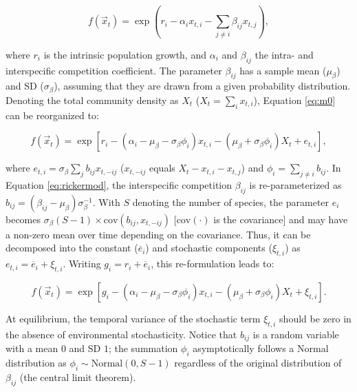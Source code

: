 \documentclass[12pt, class=article, crop=false]{standalone}
\begin{document}
\begin{equation}
\label{eq:ricker}
f(\overset{\rightarrow}{x}_{t}) = \exp(r_i - \alpha_i x_{t,i} - \sum_{j \ne i} \beta_{ij} x_{t,j}),
\end{equation}

where $r_i$ is the intrinsic population growth, and $\alpha_{i}$ and $\beta_{ij}$ the intra- and interspecific competition coefficient.
The parameter $\beta_{ij}$ has a sample mean ($\mu_{\beta}$) and SD ($\sigma_{\beta}$), assuming that they are drawn from a given probability distribution. 
Denoting the total community density as $X_t$ ($X_t = \sum_i x_{t,i}$), Equation \ref{eq:m0} can be reorganized to:

\begin{equation}
\label{eq:rickermod}
f(\overset{\rightarrow}{x}_{t}) = \exp\left[r_i - (\alpha_i - \mu_{\beta} - \sigma_{\beta} \phi_i) x_{t,i} - (\mu_{\beta} +  \sigma_{\beta} \phi_i) X_t + e_{t,i} \right],
\end{equation}

where $e_{t,i} = \sigma_{\beta} \sum_{j} b_{ij} x_{t,-ij}$ ($x_{t,-ij}$ equals $X_t - x_{t,i} - x_{t,j}$) and $\phi_i = \sum_{j \ne i} b_{ij}$.
In Equation \ref{eq:rickermod}, the interspecific competition $\beta_{ij}$ is re-parameterized as $b_{ij} = (\beta_{ij} - \mu_{\beta}) \sigma_{\beta}^{-1}$.
With $S$ denoting the number of species, the parameter $e_i$ becomes $\sigma_{\beta}(S - 1) \times \mbox{cov} (b_{ij}, x_{t,-ij})$ [$\mbox{cov}(\cdot)$ is the covariance] and may have a non-zero mean over time depending on the covariance.
Thus, it can be decomposed into the constant ($\overline{e}_i$) and stochastic components ($\xi_{t,i}$) as $e_{t,i} = \overline{e}_i + \xi_{t,i}$.
Writing $g_{i} = r_i + \overline{e}_i$, this re-formulation leads to:

\begin{equation}
    f(\overset{\rightarrow}{x}_{t}) = \exp\left[g_{i} - (\alpha_i - \mu_{\beta} - \sigma_{\beta} \phi_i) x_{t,i} - (\mu_{\beta} +  \sigma_{\beta} \phi_i) X_t + \xi_{t,i} \right].
\end{equation}

At equilibrium, the temporal variance of the stochastic term $\xi_{t,i}$ should be zero in the absence of environmental stochasticity.
Notice that $b_{ij}$ is a random variable with a mean $0$ and SD $1$; the summation $\phi_i$ asymptotically follows a Normal distribution as $\phi_i \sim \mbox{Normal}(0, S - 1)$ regardless of the original distribution of $\beta_{ij}$ (the central limit theorem).
\end{document}
